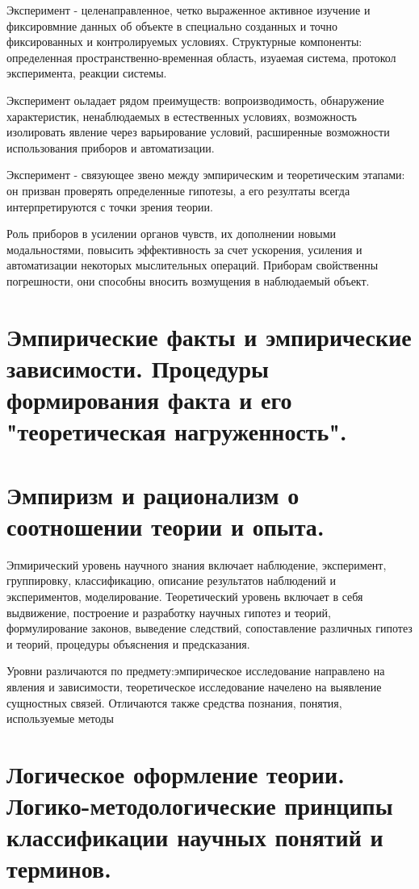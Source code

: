 \documentclass[12pt, specialist, subf, substylefile = spbu.rtx]{disser}
\begin{document}
Эксперимент - целенаправленное, четко выраженное активное изучение и фиксировмние данных об объекте в специально созданных и точно фиксированных и контролируемых условиях. Структурные компоненты: определенная пространственно-временная область, изуаемая система, протокол эксперимента, реакции системы.

Эксперимент оьладает рядом преимуществ: вопроизводимость, обнаружение характеристик, ненаблюдаемых в естественных условиях, возможность изолировать явление через варьирование условий, расширенные возможности использования приборов и автоматизации.

Эксперимент - связующее звено между эмпирическим и теоретическим этапами: он призван проверять определенные гипотезы, а его резултаты всегда интерпретируются с точки зрения теории. 

Роль приборов в усилении органов чувств, их дополнении новыми модальностями, повысить эффективность за счет ускорения, усиления и автоматизации некоторых мыслительных операций. Приборам свойственны погрешности, они способны вносить возмущения в наблюдаемый объект.

\section{Эмпирические факты и эмпирические зависимости. Процедуры формирования факта и его "теоретическая нагруженность".}

\section{Эмпиризм и рационализм о соотношении теории и опыта.}
Эпмирический уровень научного знания включает наблюдение, эксперимент, группировку, классификацию, описание результатов наблюдений и экспериментов, моделирование. Теоретический уровень включает в себя выдвижение, построение и разработку научных гипотез и теорий, формулирование законов, выведение следствий, сопоставление различных гипотез и теорий, процедуры объяснения и предсказания.

Уровни различаются по предмету:эмпирическое исследование направлено на явления и зависимости, теоретическое исследование начелено на выявление сущностных связей. Отличаются также средства познания, понятия, используемые методы

\section{Логическое оформление теории. Логико-методологические принципы классификации научных понятий и терминов.}
\end{document}
